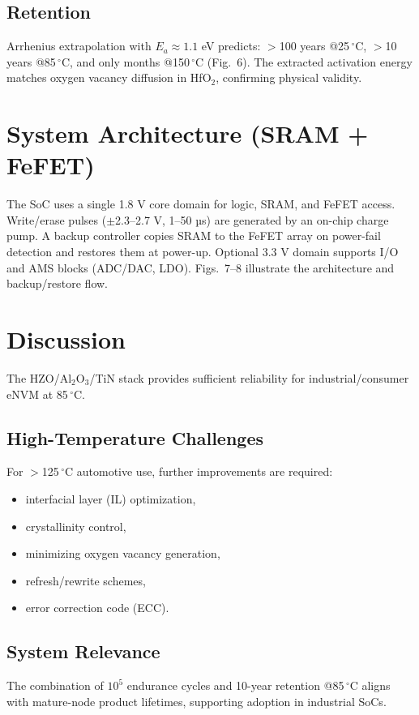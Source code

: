 \documentclass[conference]{IEEEtran}
\begin{document}
\subsection{Retention}
Arrhenius extrapolation with $E_a \approx 1.1$ eV predicts:  
$>$100 years @25\,$^\circ$C, $>$10 years @85\,$^\circ$C, and only months @150\,$^\circ$C (Fig.~6).  
The extracted activation energy matches oxygen vacancy diffusion in HfO$_2$, confirming physical validity.

\section{System Architecture (SRAM + FeFET)}
The SoC uses a single 1.8 V core domain for logic, SRAM, and FeFET access.  
Write/erase pulses ($\pm$2.3–2.7 V, 1–50 µs) are generated by an on-chip charge pump.  
A backup controller copies SRAM to the FeFET array on power-fail detection and restores them at power-up.  
Optional 3.3 V domain supports I/O and AMS blocks (ADC/DAC, LDO).  
Figs.~7–8 illustrate the architecture and backup/restore flow.

\section{Discussion}
The HZO/Al$_2$O$_3$/TiN stack provides sufficient reliability for industrial/consumer eNVM at 85\,$^\circ$C.  

\subsection{High-Temperature Challenges}
For $>$125\,$^\circ$C automotive use, further improvements are required:  
\begin{itemize}
  \item interfacial layer (IL) optimization,  
  \item crystallinity control,  
  \item minimizing oxygen vacancy generation,  
  \item refresh/rewrite schemes,  
  \item error correction code (ECC).  
\end{itemize}

\subsection{System Relevance}
The combination of $10^5$ endurance cycles and 10-year retention @85\,$^\circ$C aligns with mature-node product lifetimes, supporting adoption in industrial SoCs.
\end{document}
